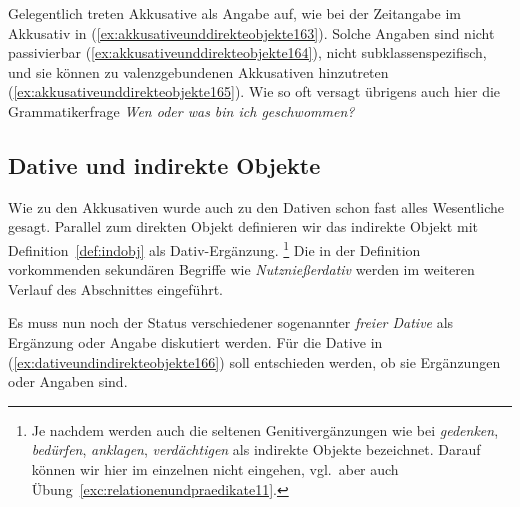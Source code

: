 Gelegentlich treten Akkusative als Angabe auf, wie bei der Zeitangabe im Akkusativ in (\ref{ex:akkusativeunddirekteobjekte163}).
Solche Angaben sind nicht passivierbar (\ref{ex:akkusativeunddirekteobjekte164}), nicht subklassenspezifisch, und sie können zu valenzgebundenen Akkusativen hinzutreten (\ref{ex:akkusativeunddirekteobjekte165}).
Wie so oft versagt übrigens auch hier die Grammatikerfrage \textit{Wen oder was bin ich geschwommen?}

\begin{exe}
  \ex\label{ex:akkusativeunddirekteobjekte162}
  \begin{xlist}
  \end{xlist}
\end{exe}

\subsection{Dative und indirekte Objekte}
\label{sec:dativeundindirekteobjekte}


Wie zu den Akkusativen wurde auch zu den Dativen schon fast alles Wesentliche gesagt.
Parallel zum direkten Objekt definieren wir das indirekte Objekt mit Definition~\ref{def:indobj} als Dativ-Ergänzung.%
\footnote{Je nachdem werden auch die seltenen Genitivergänzungen wie bei \textit{gedenken}, \textit{bedürfen}, \textit{anklagen}, \textit{verdächtigen} als indirekte Objekte bezeichnet.
Darauf können wir hier im einzelnen nicht eingehen, vgl.\ aber auch Übung~\ref{exc:relationenundpraedikate11}.}
Die in der Definition vorkommenden sekundären Begriffe wie \textit{Nutznießerdativ} werden im weiteren Verlauf des Abschnittes eingeführt.



Es muss nun noch der Status verschiedener sogenannter \textit{freier Dative} als Ergänzung oder Angabe diskutiert werden.
Für die Dative in (\ref{ex:dativeundindirekteobjekte166}) soll entschieden werden, ob sie Ergänzungen oder Angaben sind.

